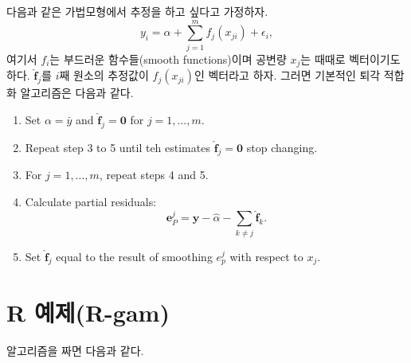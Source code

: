\documentclass[b5paper,]{scrbook}
\makeatletter
\newenvironment{Shaded}{\begin{snugshade}}{\end{snugshade}}
\newcommand{\KeywordTok}[1]{\textcolor[rgb]{0.13,0.29,0.53}{\textbf{{#1}}}}
\newcommand{\DataTypeTok}[1]{\textcolor[rgb]{0.13,0.29,0.53}{{#1}}}
\newcommand{\DecValTok}[1]{\textcolor[rgb]{0.00,0.00,0.81}{{#1}}}
\newcommand{\FloatTok}[1]{\textcolor[rgb]{0.00,0.00,0.81}{{#1}}}
\newcommand{\StringTok}[1]{\textcolor[rgb]{0.31,0.60,0.02}{{#1}}}
\newcommand{\CommentTok}[1]{\textcolor[rgb]{0.56,0.35,0.01}{\textit{{#1}}}}
\newcommand{\OtherTok}[1]{\textcolor[rgb]{0.56,0.35,0.01}{{#1}}}
\newcommand{\NormalTok}[1]{{#1}}
\theoremstyle{plain}
\theoremstyle{definition}
\numberwithin{equation}{section}
\newenvironment{kframe}{%
\medskip{}
\setlength{\fboxsep}{.8em}
 \def\at@end@of@kframe{}%
 \ifinner\ifhmode%
  \def\at@end@of@kframe{\end{minipage}}%
  \begin{minipage}{\columnwidth}%
 \fi\fi%
 \def\FrameCommand##1{\hskip\@totalleftmargin \hskip-\fboxsep
 \colorbox{shadecolor}{##1}\hskip-\fboxsep
     \hskip-\linewidth \hskip-\@totalleftmargin \hskip\columnwidth}%
 \MakeFramed {\advance\hsize-\width
   \@totalleftmargin\z@ \linewidth\hsize
   \@setminipage}}%
 {\par\unskip\endMakeFramed%
 \at@end@of@kframe}
\renewenvironment{Shaded}{\begin{kframe}}{\end{kframe}}
\makeatother
\begin{document}
다음과 같은 가법모형에서 추정을 하고 싶다고 가정하자.
\[y_{i}=\alpha + \sum_{j=1}^{m}f_{j}(x_{ji})+\epsilon_{i},\] 여기서
\(f_{i}\)는 부드러운 함수들(smooth functions)이며 공변량 \(x_{j}\)는
때때로 벡터이기도 하다. \(\hat{\mathbf{f}}_{j}\)를 \(i\)째 원소의
추정값이 \(f_{j}(x_{ji})\)인 벡터라고 하자. 그러면 기본적인 퇴각 적합화
알고리즘은 다음과 같다.

\begin{enumerate}
\def\labelenumi{\arabic{enumi}.}
\item
  Set \(\alpha=\bar{y}\) and \(\hat{\mathbf{f}}_{j}=\mathbf{0}\) for
  \(j=1,\ldots , m\).
\item
  Repeat step 3 to 5 until teh estimates
  \(\hat{\mathbf{f}}_{j}=\mathbf{0}\) stop changing.
\item
  For \(j=1,\ldots ,m\), repeat steps 4 and 5.
\item
  Calculate partial residuals:
  \[\mathbf{e}_{P}^{j}=\mathbf{y}-\hat{\alpha}-\sum_{k\neq j}\hat{\mathbf{f}}_{k}.\]
\item
  Set \(\hat{\mathbf{f}}_{j}\) equal to the result of smoothing
  \(e_{p}^{j}\) with respect to \(x_{j}\).
\end{enumerate}

\section{R 예제(R-gam)}\label{r-r-gam}

알고리즘을 짜면 다음과 같다.

\begin{Shaded}
\end{Shaded}
\end{document}
